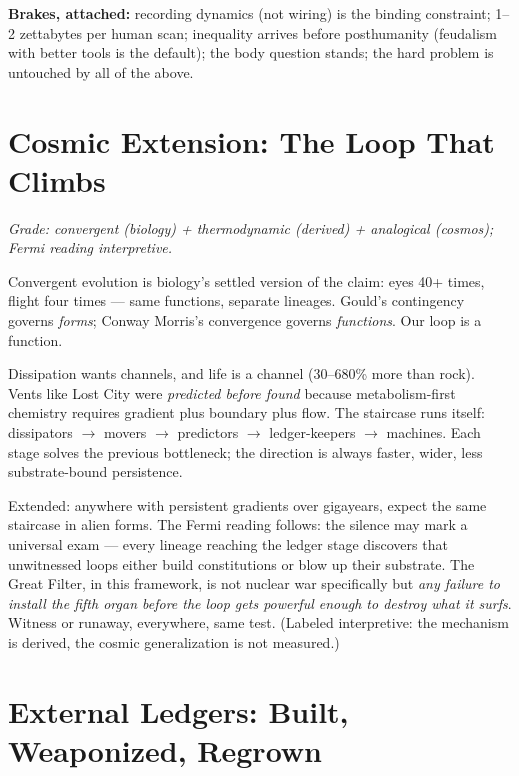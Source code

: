 \documentclass[11pt]{article}
\begin{document}
\textbf{Brakes, attached:} recording dynamics (not wiring) is the binding constraint; 1--2 zettabytes per human scan; inequality arrives before posthumanity (feudalism with better tools is the default); the body question stands; the hard problem is untouched by all of the above.

\section{Cosmic Extension: The Loop That Climbs}
\label{sec:cosmos}

\textit{Grade: convergent (biology) + thermodynamic (derived) + analogical (cosmos); Fermi reading interpretive.}

Convergent evolution is biology's settled version of the claim: eyes 40+ times, flight four times --- same functions, separate lineages. Gould's contingency governs \emph{forms}; Conway Morris's convergence governs \emph{functions}. Our loop is a function.

Dissipation wants channels, and life is a channel (30--680\% more than rock). Vents like Lost City were \emph{predicted before found} because metabolism-first chemistry requires gradient plus boundary plus flow. The staircase runs itself: dissipators $\to$ movers $\to$ predictors $\to$ ledger-keepers $\to$ machines. Each stage solves the previous bottleneck; the direction is always faster, wider, less substrate-bound persistence.

Extended: anywhere with persistent gradients over gigayears, expect the same staircase in alien forms. The Fermi reading follows: the silence may mark a universal exam --- every lineage reaching the ledger stage discovers that unwitnessed loops either build constitutions or blow up their substrate. The Great Filter, in this framework, is not nuclear war specifically but \emph{any failure to install the fifth organ before the loop gets powerful enough to destroy what it surfs}. Witness or runaway, everywhere, same test. (Labeled interpretive: the mechanism is derived, the cosmic generalization is not measured.)

\section{External Ledgers: Built, Weaponized, Regrown}
\label{sec:ledgers}
\end{document}
